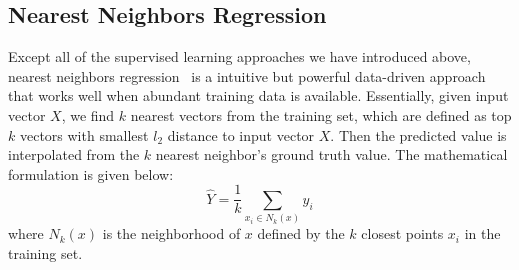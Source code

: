 \subsection{Nearest Neighbors Regression}
\label{sub:nearest_neighbor}
Except all of the supervised learning approaches we have introduced above, nearest neighbors regression~\cite{hardle1990} is a intuitive but powerful data-driven approach that works well when abundant training data is available.
Essentially, given input vector $X$, we find $k$ nearest vectors from the training set, which are defined as top $k$ vectors with smallest $l_2$ distance to input vector $X$.
Then the predicted value is interpolated from the $k$ nearest neighbor's ground truth value. 
The mathematical formulation is given below:
\begin{equation}
	\hat{Y} = \frac{1}{k} \sum \limits_{x_i \in N_k(x)} y_i
\end{equation}
where $N_k(x)$ is the neighborhood of $x$ defined by the $k$ closest points $x_i$ in the training set.
